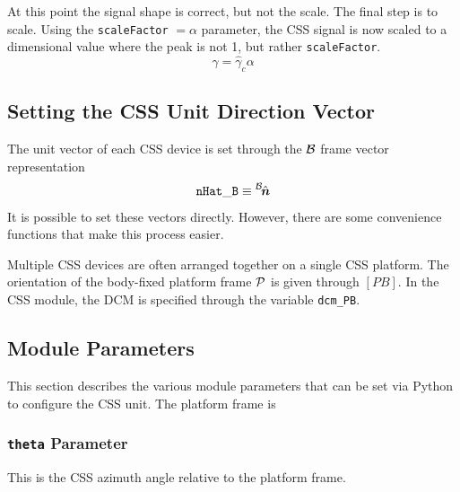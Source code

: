 \documentclass[]{BasiliskReportMemo}
\begin{document}
At this point the signal shape is correct, but not the scale.  The final step is to scale.  Using the {\tt scaleFactor} $=\alpha$ parameter, the CSS signal is now scaled to a dimensional value where the peak is not 1, but rather {\tt scaleFactor}.  
\begin{equation}
	\gamma = \hat{\gamma}_{c} \alpha
\end{equation}





\subsection{Setting the CSS Unit Direction Vector}
The unit vector of each CSS device is set through the $\cal B$ frame vector representation
\begin{equation}
		{\tt nHat\_B} \equiv \leftexp{B}{\hat{\bm n}}
\end{equation}
It is possible to set these vectors directly.  However, there are some convenience functions that make this process easier.  

Multiple CSS devices are often arranged together on a single CSS platform.  The orientation of the body-fixed platform frame $\cal P$ is given through $[PB]$.  In the CSS module, the DCM is specified through the variable {\tt dcm\_PB}.








\subsection{Module Parameters}
This section describes the various module parameters that can be set via Python to configure the CSS unit.  The platform frame is 

\subsubsection{{\tt theta} Parameter}
This is the CSS azimuth angle relative to the platform frame.
\end{document}

